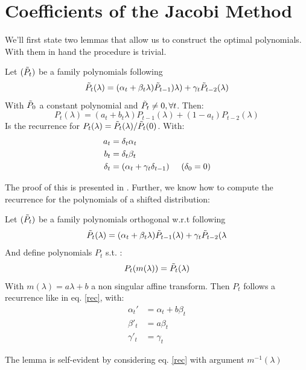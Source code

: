 \documentclass{article}
\begin{document}
\section{Coefficients  of the Jacobi Method}
We'll first state two lemmas that allow us to construct the optimal polynomials. With them in hand the procedure is trivial.

\begin{lemma}
Let $(\Tilde{P}_t)$ be a family polynomials  following  
\begin{equation*}
    \Tilde{P}_t(\lambda)=(\alpha_t+\beta_t\lambda)\Tilde{P}_{t-1})\lambda)+\gamma_t\Tilde{P}_{t-2}(\lambda)
\end{equation*}
With $\Tilde{P}_0$ a constant polynomial and $\Tilde{P}_t\neq0, \forall t$. Then:
\begin{equation}
    P_t(\lambda)=(a_t+b_t\lambda)P_{t-1}(\lambda)+(1-a_t)P_{t-2}(\lambda)
\end{equation} Is the recurrence for $P_t(\lambda)=\Tilde{P}_t(\lambda)/\Tilde{P}_t(0)$. With:
\begin{align}
    a_t&=\delta_t\alpha_t \\
    b_t&=\delta_t\beta_t \\
    \delta_t&=(\alpha_t+\gamma_t\delta_{t-1}) \hspace{0.5 cm } (\delta_0=0)
\end{align}
\end{lemma}
The proof of this is presented in \cite{pedregosa2020acceleration}. Further, we know how to compute the recurrence for the polynomials of a shifted distribution:
\begin{lemma}

Let $(\Tilde{P}_t)$ be a family polynomials orthogonal w.r.t  following  
\begin{equation}    \label{rec}
    \Tilde{P}_t(\lambda)=(\alpha_t+\beta_t\lambda)\Tilde{P}_{t-1}(\lambda)+\gamma_t\Tilde{P}_{t-2}(\lambda
\end{equation}
And define polynomials $P_t$ s.t. :
$$
P_t(m(\lambda))=\Tilde{P}_t(\lambda)
$$
With $m(\lambda)=a\lambda+b$ a non singular affine transform. Then $P_t$ follows a recurrence like in eq. \eqref{rec}, with:
\begin{align}
    \alpha_t'&=\alpha_t+b\beta_t \\
    \beta'_t&=a\beta_t\\
    \gamma'_t&=\gamma_t
\end{align}
\end{lemma}
The lemma is self-evident by considering eq. \eqref{rec} with argument $m^{-1}(\lambda)$
\end{document}
